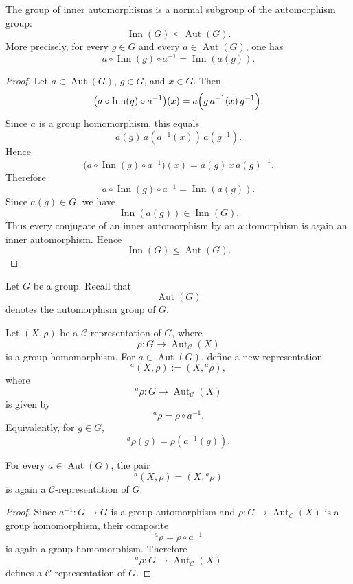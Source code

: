 \begin{proposition}
    The group of inner automorphisms is a normal subgroup of the automorphism
    group:
    \[
        \operatorname{Inn}(G)\trianglelefteq \operatorname{Aut}(G).
    \]
    More precisely, for every \(g\in G\) and every \(a\in \operatorname{Aut}(G)\),
    one has
    \[
        a\circ \operatorname{Inn}(g)\circ a^{-1}
        =
        \operatorname{Inn}(a(g)).
    \]
\end{proposition}

\begin{proof}
    Let \(a\in \operatorname{Aut}(G)\), \(g\in G\), and \(x\in G\). Then
    \[
        \bigl(a\circ \operatorname{Inn}(g)\circ a^{-1}\bigr)(x)
        =
        a\Bigl(g\,a^{-1}(x)\,g^{-1}\Bigr).
    \]
    Since \(a\) is a group homomorphism, this equals
    \[
        a(g)\,a(a^{-1}(x))\,a(g^{-1}).
    \]
    Hence
    \[
        \bigl(a\circ \operatorname{Inn}(g)\circ a^{-1}\bigr)(x)
        =
        a(g)\,x\,a(g)^{-1}.
    \]
    Therefore
    \[
        a\circ \operatorname{Inn}(g)\circ a^{-1}
        =
        \operatorname{Inn}(a(g)).
    \]
    Since \(a(g)\in G\), we have
    \[
        \operatorname{Inn}(a(g))\in \operatorname{Inn}(G).
    \]
    Thus every conjugate of an inner automorphism by an automorphism is again an
    inner automorphism. Hence
    \[
        \operatorname{Inn}(G)\trianglelefteq \operatorname{Aut}(G).
    \]
\end{proof}

Let \(G\) be a group. Recall that
\[
    \operatorname{Aut}(G)
\]
denotes the automorphism group of \(G\).

Let \((X,\rho)\) be a \(\mathcal{C}\)-representation of \(G\), where
\[
    \rho:G\longrightarrow \operatorname{Aut}_{\mathcal{C}}(X)
\]
is a group homomorphism. For \(a\in \operatorname{Aut}(G)\), define a new
representation
\[
    {}^{a}(X,\rho):=(X,{}^{a}\rho),
\]
where
\[
    {}^{a}\rho:G\longrightarrow \operatorname{Aut}_{\mathcal{C}}(X)
\]
is given by
\[
    {}^{a}\rho=\rho\circ a^{-1}.
\]
Equivalently, for \(g\in G\),
\[
    {}^{a}\rho(g)=\rho(a^{-1}(g)).
\]

\begin{lemma}
    For every \(a\in \operatorname{Aut}(G)\), the pair
    \[
        {}^{a}(X,\rho)=(X,{}^{a}\rho)
    \]
    is again a \(\mathcal{C}\)-representation of \(G\).
\end{lemma}

\begin{proof}
    Since \(a^{-1}:G\to G\) is a group automorphism and
    \(\rho:G\to \operatorname{Aut}_{\mathcal{C}}(X)\) is a group homomorphism,
    their composite
    \[
        {}^{a}\rho=\rho\circ a^{-1}
    \]
    is again a group homomorphism. Therefore
    \[
        {}^{a}\rho:G\longrightarrow \operatorname{Aut}_{\mathcal{C}}(X)
    \]
    defines a \(\mathcal{C}\)-representation of \(G\).
\end{proof}

